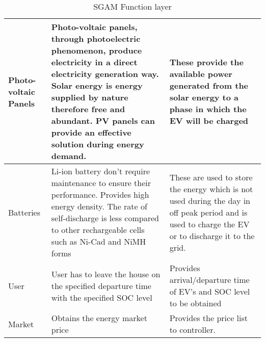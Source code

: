 \begin{table}[h!b]
\begin{tabular} { | p{3cm} | p{7cm} | p{7cm} | }
		\hline
         Photo-voltaic Panels & Photo-voltaic panels, through photoelectric phenomenon, produce electricity in a direct electricity generation way. Solar energy is energy supplied by nature therefore free and abundant.  PV panels can provide an effective solution during energy demand.  & These provide the available power generated from the solar energy to a phase in which the EV will be charged  \\ 
		\hline
         Batteries & Li-ion battery don’t require maintenance to ensure their performance. Provides high energy density. The rate of self-discharge is less compared to other rechargeable cells such as Ni-Cad and NiMH forms  & These are used to store the energy which is not used during the day in off peak period and is used to charge the EV or to discharge it to the grid.  \\
		\hline
         User & User has to leave the house on the specified departure time with the specified SOC level & Provides arrival/departure time of EV’s and SOC level to be obtained \\ 
         \hline
         Market & Obtains the energy market price & Provides the price list to controller. \\
		\hline
       
	\end{tabular}
    \caption{SGAM Function layer}
    \label{table:6} 
\end{table}